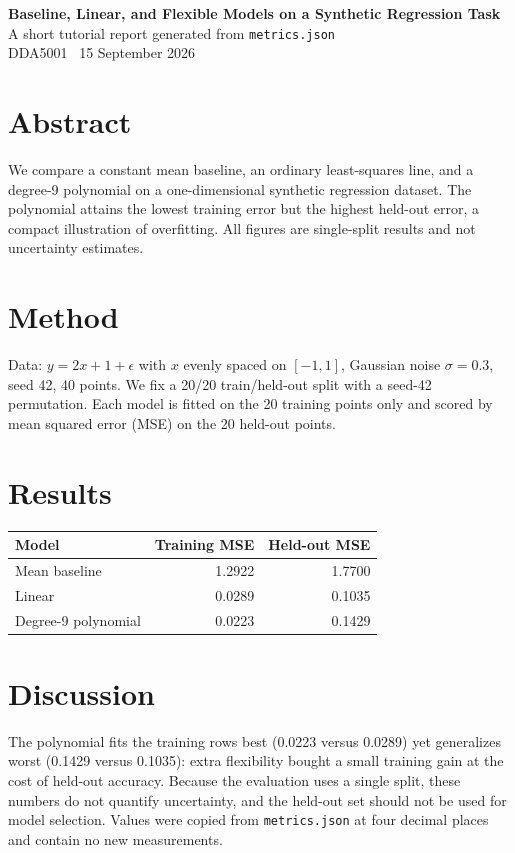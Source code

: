 \documentclass[10pt]{article}
\begin{document}
\begin{center}
{\Large\bfseries Baseline, Linear, and Flexible Models on a Synthetic Regression Task}\\[1.5mm]
{\small A short tutorial report generated from \texttt{metrics.json}}\\[1mm]
{\small DDA5001 \textperiodcentered\ 15 September 2026}
\end{center}
\vspace{1mm}

\section*{Abstract}
We compare a constant mean baseline, an ordinary least-squares line, and a
degree-9 polynomial on a one-dimensional synthetic regression dataset. The
polynomial attains the lowest training error but the highest held-out error,
a compact illustration of overfitting. All figures are single-split results and
not uncertainty estimates.

\section*{Method}
Data: $y = 2x + 1 + \epsilon$ with $x$ evenly spaced on $[-1,1]$, Gaussian noise
$\sigma = 0.3$, seed 42, 40 points. We fix a 20/20 train/held-out split with a
seed-42 permutation. Each model is fitted on the 20 training points only and
scored by mean squared error (MSE) on the 20 held-out points.

\section*{Results}
\begin{center}
\renewcommand{\arraystretch}{1.2}
\begin{tabular}{lrr}
\toprule
Model & Training MSE & Held-out MSE \\
\midrule
Mean baseline & 1.2922 & 1.7700 \\
Linear & 0.0289 & 0.1035 \\
Degree-9 polynomial & 0.0223 & 0.1429 \\
\bottomrule
\end{tabular}
\end{center}

\section*{Discussion}
The polynomial fits the training rows best (0.0223 versus 0.0289) yet generalizes
worst (0.1429 versus 0.1035): extra flexibility bought a small training gain at the
cost of held-out accuracy. Because the evaluation uses a single split, these
numbers do not quantify uncertainty, and the held-out set should not be used for
model selection. Values were copied from \texttt{metrics.json} at four decimal
places and contain no new measurements.
\end{document}
